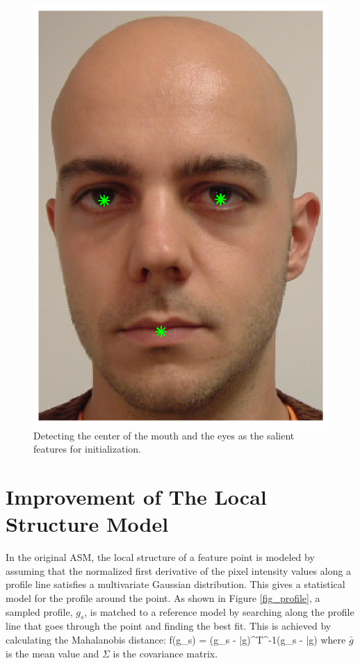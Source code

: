 \begin{figure}[tbp]
\begin{center}
\includegraphics[scale=0.8]{./chapters/figures/initial.eps}
\caption{Detecting the center of the mouth and the eyes as the
salient features for initialization.} \label{fig_initialization}
\end{center}
\end{figure}
\section{Improvement of The Local Structure Model} In the
original ASM, the local structure of a feature point is modeled by
assuming that the normalized first derivative of the pixel intensity
values along a profile line satisfies a multivariate Gaussian
distribution. This gives a statistical model for the profile around
the point. As shown in Figure \ref{fig_profile}, a sampled profile,
$g_s$, is matched to a reference model by searching along the
profile line that goes through the point and finding the best fit.
This is achieved by calculating the Mahalanobis distance: \beq
\label{Mahalanobis_eq}f(g_s) = (g_s - \bar{g})^T\Sigma^{-1}(g_s -
\bar{g}) \eeq where $\bar{g}$ is the mean value and $\Sigma$ is the
covariance matrix.

